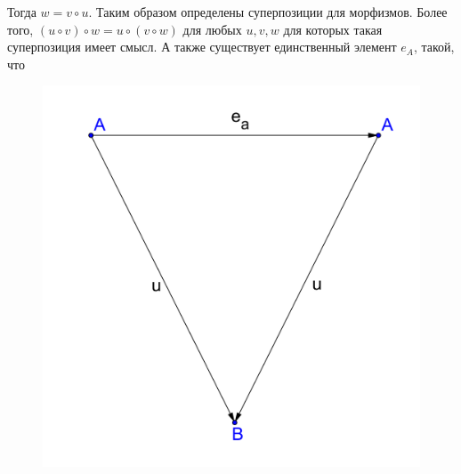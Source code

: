 \documentclass[a4paper, 12pt]{report}
\begin{document}
\begin{enumerate}
      Тогда $w = v \circ u$. Таким образом определены суперпозиции для морфизмов. Более того, $(u \circ v) \circ w = u \circ (v \circ w)$ для любых $u, v, w$ для которых такая суперпозиция имеет смысл. А также существует единственный элемент $e_A$, такой, что
      \begin{figure}[htbp]
        \begin{center}
             \begin{minipage}[h]{0,45\linewidth}
                \includegraphics[width=1\linewidth]{lect5/Properity1pic2.png}
            \end{minipage}
        \hfill
            \begin{minipage}[h]{0.45\linewidth}

\end{minipage}
\end{center}
\end{figure}
\end{enumerate}
\end{document}
